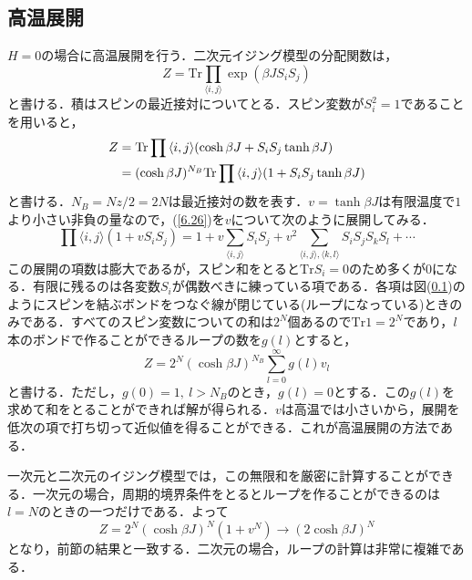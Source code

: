 \documentclass[a4paper,11pt]{jsarticle}
\begin{document}
\subsection{高温展開}
$H=0$の場合に高温展開を行う．二次元イジング模型の分配関数は，
\begin{equation}
  Z = \mathrm{Tr}\prod_{\langle i,j \rangle} \exp{(\beta J S_i S_j)}
\end{equation}
と書ける．積はスピンの最近接対についてとる．スピン変数が$S_i^2=1$であることを用いると，
\begin{align}
  Z
   & = \mathrm{Tr} \prod{\langle i,j \rangle} (\cosh{\beta J} + S_i S_j \tanh{\beta J}) \notag               \\
   & = (\cosh{\beta J})^{N_B}\mathrm{Tr} \prod{\langle i,j \rangle}(1 + S_i S_j \tanh{\beta J}) \label{6.26}
\end{align}
と書ける．$N_B=Nz/2=2N$は最近接対の数を表す．$v=\tanh{\beta J}$は有限温度で$1$より小さい非負の量なので，(\ref{6.26})を$v$について次のように展開してみる．
\begin{equation}
  \prod{\langle i,j \rangle}(1 + v S_i S_j)
  = 1 + v\sum_{\langle i,j \rangle} S_i S_j + v^2 \sum_{\langle i,j \rangle, \langle k,l \rangle} S_i S_j S_k S_l + \cdots
\end{equation}
この展開の項数は膨大であるが，スピン和をとると$\mathrm{Tr}S_i=0$のため多くが$0$になる．有限に残るのは各変数$S_i$が偶数べきに練っている項である．各項は図(\ref{})のようにスピンを結ぶボンドをつなぐ線が閉じている(ループになっている)ときのみである．すべてのスピン変数についての和は$2^N$個あるので$\mathrm{Tr}1=2^N$であり，$l$本のボンドで作ることができるループの数を$g(l)$とすると，
\begin{equation}
  Z = 2^N(\cosh{\beta J})^{N_B} \sum_{l=0}^{\infty} g(l) v_l
\end{equation}
と書ける．ただし，$g(0)=1, \ l>N_B$のとき，$g(l)=0$とする．この$g(l)$を求めて和をとることができれば解が得られる．$v$は高温では小さいから，展開を低次の項で打ち切って近似値を得ることができる．これが高温展開の方法である．\par
一次元と二次元のイジング模型では，この無限和を厳密に計算することができる．一次元の場合，周期的境界条件をとるとループを作ることができるのは$l=N$のときの一つだけである．よって
\begin{equation}
  Z = 2^N (\cosh{\beta J})^N (1 + v^N) \rightarrow (2 \cosh{\beta J})^N
\end{equation}
となり，前節の結果と一致する．二次元の場合，ループの計算は非常に複雑である．
\end{document}

